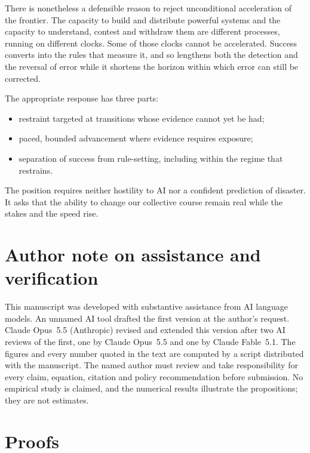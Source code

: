 \documentclass[11pt]{article}
\theoremstyle{plain}
\theoremstyle{definition}
\begin{document}
There is nonetheless a defensible reason to reject unconditional acceleration of the frontier. The capacity to build and distribute powerful systems and the capacity to understand, contest and withdraw them are different processes, running on different clocks. Some of those clocks cannot be accelerated. Success converts into the rules that measure it, and so lengthens both the detection and the reversal of error while it shortens the horizon within which error can still be corrected.

The appropriate response has three parts:
\begin{itemize}[leftmargin=*]
\item restraint targeted at transitions whose evidence cannot yet be had;
\item paced, bounded advancement where evidence requires exposure;
\item separation of success from rule-setting, including within the regime that restrains.
\end{itemize}
The position requires neither hostility to AI nor a confident prediction of disaster. It asks that the ability to change our collective course remain real while the stakes and the speed rise.

\section*{Author note on assistance and verification}
This manuscript was developed with substantive assistance from AI language models. An unnamed AI tool drafted the first version at the author's request. Claude Opus~5.5 (Anthropic) revised and extended this version after two AI reviews of the first, one by Claude Opus~5.5 and one by Claude Fable~5.1. The figures and every number quoted in the text are computed by a script distributed with the manuscript. The named author must review and take responsibility for every claim, equation, citation and policy recommendation before submission. No empirical study is claimed, and the numerical results illustrate the propositions; they are not estimates.

\appendix
\section{Proofs}\label{app:proofs}
\end{document}
